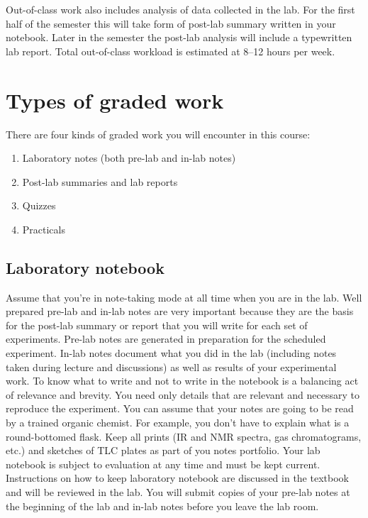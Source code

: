 Out-of-class work also includes analysis of data collected in the lab.
For the first half of the semester this will take form of post-lab
summary written in your notebook. Later in the semester the post-lab
analysis will include a typewritten lab report. Total out-of-class
workload is estimated at 8--12 hours per week.

\hypertarget{types-of-graded-work}{%
\section{Types of graded work}\label{types-of-graded-work}}

There are four kinds of graded work you will encounter in this course:

\begin{enumerate}
\def\labelenumi{\arabic{enumi}.}
\tightlist
\item
  Laboratory notes (both pre-lab and in-lab notes)
\item
  Post-lab summaries and lab reports
\item
  Quizzes
\item
  Practicals
\end{enumerate}

\hypertarget{laboratory-notebook}{%
\subsection{Laboratory notebook}\label{laboratory-notebook}}

Assume that you're in note-taking mode at all time when you are in the
lab. Well prepared pre-lab and in-lab notes are very important because
they are the basis for the post-lab summary or report that you will
write for each set of experiments. Pre-lab notes are generated in
preparation for the scheduled experiment. In-lab notes document what you
did in the lab (including notes taken during lecture and discussions) as
well as results of your experimental work. To know what to write and not
to write in the notebook is a balancing act of relevance and brevity.
You need only details that are relevant and necessary to reproduce the
experiment. You can assume that your notes are going to be read by a
trained organic chemist. For example, you don't have to explain what is
a round-bottomed flask. Keep all prints (IR and NMR spectra, gas
chromatograms, etc.) and sketches of TLC plates as part of you notes
portfolio. Your lab notebook is subject to evaluation at any time and
must be kept current. Instructions on how to keep laboratory notebook
are discussed in the textbook and will be reviewed in the lab. You will
submit copies of your pre-lab notes at the beginning of the lab and
in-lab notes before you leave the lab room.

